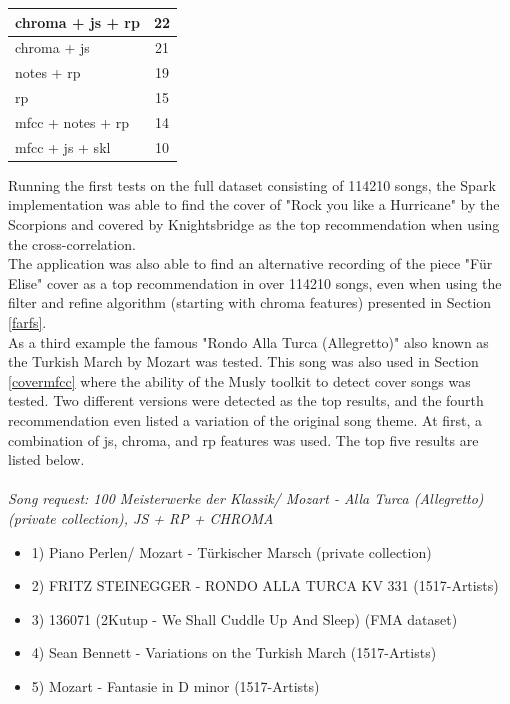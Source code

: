 \begin{table}[H]
\begin{minipage}{0.5\textwidth}
\begin{center}
\begin{tabular}{|l||c|}
				\hline
				chroma + js + rp & 22\\
				\hline
				chroma + js & 21\\
				\hline
				notes + rp & 19\\
				\hline
				rp & 15\\
				\hline
				mfcc + notes + rp & 14\\
				\hline
				mfcc + js + skl & 10\\
				\hline
			\end{tabular}
		\end{center}
	\end{minipage}
\end{table}

\noindent Running the first tests on the full dataset consisting of 114210 songs, the Spark implementation was able to find the cover of "Rock you like a Hurricane" by the Scorpions and covered by Knightsbridge as the top recommendation when using the cross-correlation.\\
\noindent The application was also able to find an alternative recording of the piece "Für Elise" cover as a top recommendation in over 114210 songs, even when using the filter and refine algorithm (starting with chroma features) presented in Section \ref{farfs}.\\
\noindent As a third example the famous "Rondo Alla Turca (Allegretto)" also known as the Turkish March by Mozart was tested. This song was also used in Section \ref{covermfcc} where the ability of the Musly toolkit to detect cover songs was tested. \noindent Two different versions were detected as the top results, and the fourth recommendation even listed a variation of the original song theme. 
At first, a combination of js, chroma, and rp features was used. The top five results are listed below.\\
\ \\
\textit{\noindent Song request: 100 Meisterwerke der Klassik/ Mozart - Alla Turca (Allegretto) (private collection), JS + RP + CHROMA}

\begin{itemize}
	\setlength\itemsep{-0.5em}
	\item 1) Piano Perlen/ Mozart - Türkischer Marsch (private collection)
	\item 2) FRITZ STEINEGGER - RONDO ALLA TURCA KV 331 (1517-Artists)
	\item 3) 136071 (2Kutup - We Shall Cuddle Up And Sleep) (FMA dataset)
	\item 4) Sean Bennett - Variations on the Turkish March (1517-Artists)
	\item 5) Mozart - Fantasie in D minor (1517-Artists)
\end{itemize}

